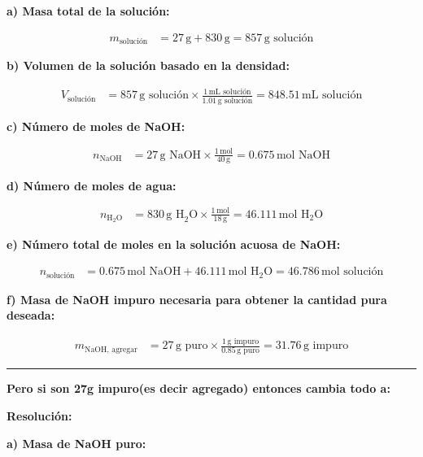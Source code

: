 \documentclass{article}
\begin{document}
\textbf{a) Masa total de la solución:}

\begin{align*}
    m_{\text{solución}} &= 27 \, \text{g} + 830 \, \text{g} = 857 \, \text{g solución}
\end{align*}

\textbf{b) Volumen de la solución basado en la densidad:}

\begin{align*}
    V_{\text{solución}} &= 857 \, \text{g solución} \times \frac{1 \, \text{mL solución}}{1.01 \, \text{g solución}} = 848.51 \, \text{mL solución}
\end{align*}

\textbf{c) Número de moles de NaOH:}

\begin{align*}
    n_{\text{NaOH}} &= 27 \, \text{g NaOH} \times \frac{1 \, \text{mol}}{40 \, \text{g}} = 0.675 \, \text{mol NaOH}
\end{align*}

\textbf{d) Número de moles de agua:}

\begin{align*}
    n_{\text{H}_2\text{O}} &= 830 \, \text{g H}_2\text{O} \times \frac{1 \, \text{mol}}{18 \, \text{g}} = 46.111 \, \text{mol H}_2\text{O}
\end{align*}

\textbf{e) Número total de moles en la solución acuosa de NaOH:}

\begin{align*}
    n_{\text{solución}} &= 0.675 \, \text{mol NaOH} + 46.111 \, \text{mol H}_2\text{O} = 46.786 \, \text{mol solución}
\end{align*}

\textbf{f) Masa de NaOH impuro necesaria para obtener la cantidad pura deseada:}

\begin{align*}
    m_{\text{NaOH, agregar}} &= 27 \, \text{g puro} \times \frac{1 \, \text{g impuro}}{0.85 \, \text{g puro}} = 31.76 \, \text{g impuro}
\end{align*}

\noindent\rule{\textwidth}{0.5pt}
\textbf{Pero si son 27g impuro(es decir agregado) entonces cambia todo a:}

\noindent\textbf{Resolución:} %

\textbf{a) Masa de NaOH puro:}
\end{document}
